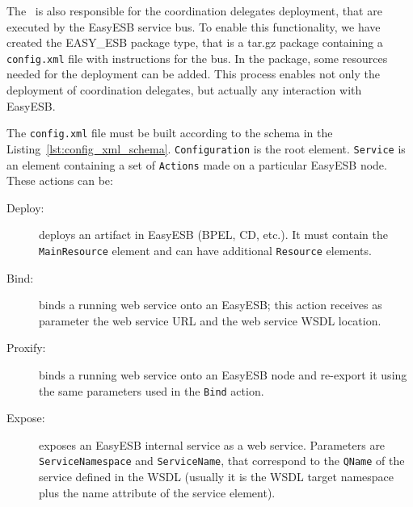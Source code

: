 The \ee\ is also responsible for the coordination delegates deployment, that are executed by the EasyESB service bus. To enable this functionality, we have created the EASY\_ESB package type, that is a tar.gz package containing a \texttt{config.xml} file with instructions for the bus. In the package, some resources needed for the deployment can be added. This process enables not only the deployment of coordination delegates, but actually any interaction with EasyESB.

The \texttt{config.xml} file must be built according to the schema in the Listing~\ref{lst:config_xml_schema}. \texttt{Configuration} is the root element. \texttt{Service} is an element containing a set of \texttt{Actions} made on a particular EasyESB node. These actions can be:

\begin{description}
\item [Deploy:] deploys an artifact in EasyESB (BPEL, CD, etc.). It must contain the \texttt{MainResource} element and can have additional \texttt{Resource} elements.
\item [Bind:] binds a running web service onto an EasyESB; this action receives as parameter the web service URL and the web service WSDL location. 
\item [Proxify:] binds a running web service onto an EasyESB node and re-export it using the same parameters used in the \texttt{Bind} action.
\item [Expose:] exposes an EasyESB internal service as a web service. Parameters are \texttt{ServiceNamespace} and \texttt{ServiceName}, that correspond to the \texttt{QName} of the service defined in the WSDL (usually it is the WSDL target namespace plus the name attribute of the service element).
\end{description}

